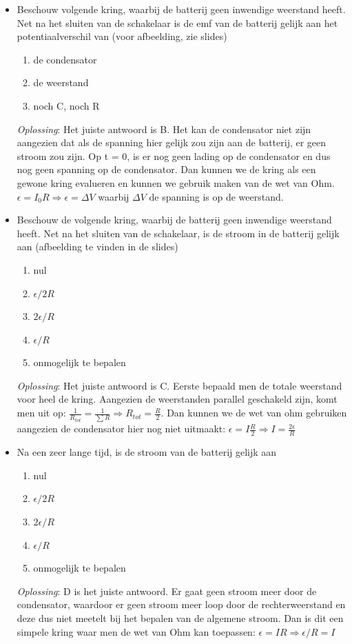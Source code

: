 \documentclass[12pt,a4paper]{article}
\begin{document}
\begin{itemize}
	\item Beschouw volgende kring, waarbij de batterij geen inwendige weerstand heeft. Net na het sluiten van de schakelaar is de emf van de batterij gelijk aan het potentiaalverschil van (voor afbeelding, zie slides)
	\begin{enumerate}[label=\alph*]
		\item de condensator
		\item de weerstand
		\item noch C, noch R
	\end{enumerate}
	\textit{Oplossing}: Het juiste antwoord is B. Het kan de condensator niet zijn aangezien dat als de spanning hier gelijk zou zijn aan de batterij, er geen stroom zou zijn. Op t = 0, is er nog geen lading op de condensator en dus nog geen spanning op de condensator. Dan kunnen we de kring als een gewone kring evalueren en kunnen we gebruik maken van de wet van Ohm. \(\epsilon = I_0R \Rightarrow \epsilon = \Delta V\) waarbij $\Delta V$ de spanning is op de weerstand. 
	\item Beschouw de volgende kring, waarbij de batterij geen inwendige weerstand heeft. Net na het sluiten van de schakelaar, is de stroom in de batterij gelijk aan (afbeelding te vinden in de slides)
	\begin{enumerate}[label=\alph*]
		\item nul
		\item $\epsilon/2R$
		\item $2\epsilon/R$
		\item $\epsilon/R$
		\item onmogelijk te bepalen
	\end{enumerate}
	\textit{Oplossing}: Het juiste antwoord is C. Eerste bepaald men de totale weerstand voor heel de kring. Aangezien de weerstanden parallel geschakeld zijn, komt men uit op: \(\frac{1}{R_{tot}} = \frac{1}{\sum R} \Rightarrow R_{tot} = \frac{R}{2}\). Dan kunnen we de wet van ohm gebruiken aangezien de condensator hier nog niet uitmaakt: \(\epsilon = I\frac{R}{2} \Rightarrow I = \frac{2\epsilon}{R}\)
	\item Na een zeer lange tijd, is de stroom van de batterij gelijk aan
	\begin{enumerate}[label=\alph*]
		\item nul
		\item $\epsilon/2R$
		\item $2\epsilon/R$
		\item $\epsilon/R$
		\item onmogelijk te bepalen
	\end{enumerate}
	\textit{Oplossing}: D is het juiste antwoord. Er gaat geen stroom meer door de condensator, waardoor er geen stroom meer loop door de rechterweerstand en deze dus niet meetelt bij het bepalen van de algemene stroom. Dan is dit een simpele kring waar men de wet van Ohm kan toepassen: \(\epsilon = IR \Rightarrow \epsilon/R = I\)
	\end{itemize}
    \newpage
\end{document}
